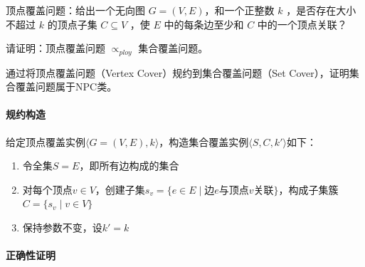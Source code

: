\documentclass[./../main.tex]{subfiles}
\begin{document}
顶点覆盖问题：给出一个无向图 $G=(V,E)$，和一个正整数 $k$ ，是否存在大小不超过 $k$ 的顶点子集 $C\subseteq V$ ，使 $E$ 中的每条边至少和 $C$ 中的一个顶点关联？

请证明：顶点覆盖问题 $∝_{ploy}$ 集合覆盖问题。

通过将顶点覆盖问题（Vertex Cover）规约到集合覆盖问题（Set Cover），证明集合覆盖问题属于NPC类。

\paragraph{规约构造}
给定顶点覆盖实例$\langle G=(V,E), k \rangle$，构造集合覆盖实例$\langle S,C,k' \rangle$如下：

\begin{enumerate}
    \item 令全集$S=E$，即所有边构成的集合
    \item 对每个顶点$v \in V$，创建子集$s_v = \{ e \in E \mid \text{边}e\text{与顶点}v\text{关联} \}$，构成子集簇$C = \{ s_v \mid v \in V \}$
    \item 保持参数不变，设$k' = k$
\end{enumerate}

\paragraph{正确性证明}
\end{document}
